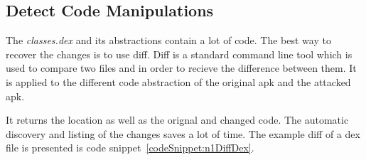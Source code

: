 \subsection{Detect Code Manipulations} \label{subsection:forensics-tools-diff}
The \textit{classes.dex} and its abstractions contain a lot of code.
The best way to recover the changes is to use diff.
Diff is a standard command line tool which is used to compare two files and in order to recieve the difference between them.
It is applied to the different code abstraction of the original \gls{apk} and the attacked \gls{apk}.
\newline

It returns the location as well as the orignal and changed code.
The automatic discovery and listing of the changes saves a lot of time.
The example diff of a dex file is presented is code snippet~\ref{codeSnippet:n1DiffDex}.
\newline

